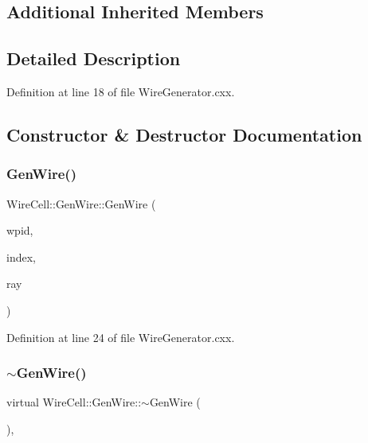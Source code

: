 \subsection*{Additional Inherited Members}


\subsection{Detailed Description}


Definition at line 18 of file Wire\+Generator.\+cxx.



\subsection{Constructor \& Destructor Documentation}
\mbox{\label{class_wire_cell_1_1_gen_wire_a4348d145a26c787ced15ddd36c248f36}} 
\subsubsection{\texorpdfstring{Gen\+Wire()}{GenWire()}}
{\footnotesize\ttfamily Wire\+Cell\+::\+Gen\+Wire\+::\+Gen\+Wire (\begin{DoxyParamCaption}\item[{\hyperlink{class_wire_cell_1_1_wire_plane_id}{Wire\+Plane\+Id}}]{wpid,  }\item[{int}]{index,  }\item[{const \hyperlink{namespace_wire_cell_a3ab20d9b438feb7eb1ffaab9ba98af0c}{Ray} \&}]{ray }\end{DoxyParamCaption})\hspace{0.3cm}{\ttfamily [inline]}}



Definition at line 24 of file Wire\+Generator.\+cxx.

\mbox{\label{class_wire_cell_1_1_gen_wire_a629bbab9ccbfd225d00209d81f93e1c1}} 
\subsubsection{\texorpdfstring{$\sim$\+Gen\+Wire()}{~GenWire()}}
{\footnotesize\ttfamily virtual Wire\+Cell\+::\+Gen\+Wire\+::$\sim$\+Gen\+Wire (\begin{DoxyParamCaption}{ }\end{DoxyParamCaption})\hspace{0.3cm}{\ttfamily [inline]}, {\ttfamily [virtual]}}



